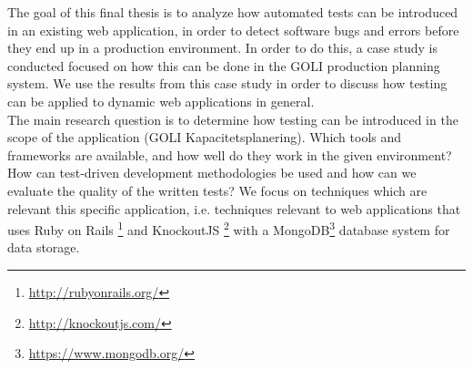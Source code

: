 
The goal of this final thesis is to analyze how automated tests can be
introduced in an existing web application, in order to detect software
bugs and errors before they end up in a production environment. In order
to do this, a case study is conducted focused on how this can be done in
the GOLI production planning system. We use the results from this case
study in order to discuss how testing can be applied to dynamic web
applications in general.\\

The main research question is to determine how testing can be introduced
in the scope of the application (GOLI Kapacitetsplanering). Which tools
and frameworks are available, and how well do they work in the given
environment? How can test-driven development methodologies be used and
how can we evaluate the quality of the written tests? We focus on
techniques which are relevant this specific application, i.e. techniques
relevant to web applications that uses Ruby on Rails
\footnote{\url{http://rubyonrails.org/}} and KnockoutJS
\footnote{\url{http://knockoutjs.com/}} with a
MongoDB\footnote{\url{https://www.mongodb.org/}} database system for
data storage.\\
